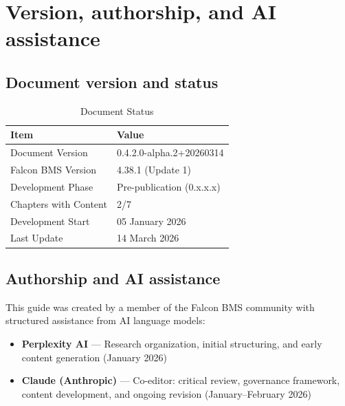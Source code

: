 \documentclass[11pt, a4paper, twoside]{report}
\newcommand{\docversion}{0.4.2.0-alpha.2}
\newcommand{\docbuild}{20260314}
\newcommand{\docstartdate}{05 January 2026}
\newcommand{\docenddate}{14 March 2026}
\newcommand{\chapterscompletedof}{2/7}
\newcommand{\fulldocversion}{\docversion+\docbuild}
\begin{document}
\section{Version, authorship, and AI assistance}
\label{sec:C1-S4}

\subsection{Document version and status}
\label{sec:C1-S4-S1}

\begin{table}[H]
	\centering
	\caption{Document Status}
	\label{tab:C1-doc-status}
	\small
	\renewcommand{\arraystretch}{1.25}
	\begin{tabular}{L{4.5cm} L{9.0cm}}
		\toprule
		\textbf{Item} & \textbf{Value} \\
		\midrule
		Document Version & \fulldocversion \\
		Falcon BMS Version & 4.38.1 (Update 1) \\
		Development Phase & Pre-publication (0.x.x.x) \\
		Chapters with Content & \chapterscompletedof \\
		Development Start & \docstartdate \\
		Last Update & \docenddate \\
		\bottomrule
	\end{tabular}
\end{table}

\subsection{Authorship and AI assistance}
\label{sec:C1-S4-S2}

This guide was created by a member of the Falcon BMS community with structured assistance from AI language models:

\begin{itemize}
	\item \textbf{Perplexity AI} --- Research organization, initial structuring, and early content generation (January 2026)
	\item \textbf{Claude (Anthropic)} --- Co-editor: critical review, governance framework, content development, and ongoing revision (January--February 2026)
\end{itemize}
\end{document}
